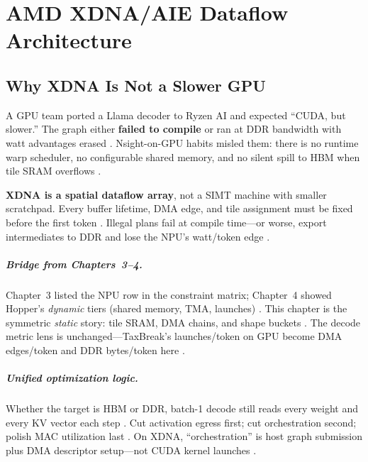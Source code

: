 \chapter{AMD XDNA/AIE Dataflow Architecture}
\label{chap:ch05}

\section{Why XDNA Is Not a Slower GPU}
\label{sec:industrial_hook}

A GPU team ported a Llama decoder to Ryzen AI and expected ``CUDA, but slower.''
The graph either \textbf{failed to compile} or ran at DDR bandwidth with watt advantages erased \citep{amd2024xdna,amd2024aie}.
Nsight-on-GPU habits misled them: there is no runtime warp scheduler, no configurable shared memory, and no silent spill to HBM when tile SRAM overflows \citep{yirage2026,nvidia2022hopper}.

\textbf{XDNA is a spatial dataflow array}, not a SIMT machine with smaller scratchpad.
Every buffer lifetime, DMA edge, and tile assignment must be fixed before the first token \citep{patel2025llminference,chen2020compilerbasedhardw}.
Illegal plans fail at compile time---or worse, export intermediates to DDR and lose the NPU's watt/token edge \citep{memoryfloor2026}.

\paragraph{Bridge from Chapters~3--4.}
Chapter~3 listed the NPU row in the constraint matrix; Chapter~4 showed Hopper's \emph{dynamic} tiers (shared memory, TMA, launches) \citep{nvidia2022hopper,semianalysis2024tma}.
This chapter is the symmetric \emph{static} story: tile SRAM, DMA chains, and shape buckets \citep{amd2024xdna,amd2024aie}.
The decode metric lens is unchanged---TaxBreak's launches/token on GPU become DMA edges/token and DDR bytes/token here \citep{taxbreak2026,memoryfloor2026}.

\paragraph{Unified optimization logic.}
Whether the target is HBM or DDR, batch-1 decode still reads every weight and every KV vector each step \citep{dao2022flashattention,dlbook}.
Cut activation egress first; cut orchestration second; polish MAC utilization last \citep{memoryfloor2026,taxbreak2026}.
On XDNA, ``orchestration'' is host graph submission plus DMA descriptor setup---not CUDA kernel launches \citep{amd2024xdna,yirage2026}.

